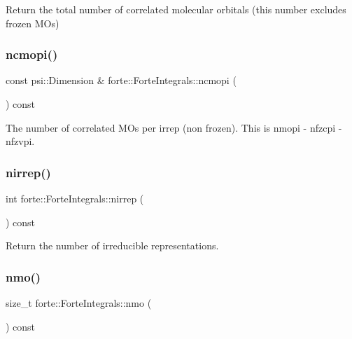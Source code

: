 Return the total number of correlated molecular orbitals (this number excludes frozen M\+Os) 

\mbox{\label{classforte_1_1_forte_integrals_a95947448d8e40f2be497e613512e64eb}} 
\subsubsection{\texorpdfstring{ncmopi()}{ncmopi()}}
{\footnotesize\ttfamily const psi\+::\+Dimension \& forte\+::\+Forte\+Integrals\+::ncmopi (\begin{DoxyParamCaption}{ }\end{DoxyParamCaption}) const}



The number of correlated M\+Os per irrep (non frozen). This is nmopi -\/ nfzcpi -\/ nfzvpi. 

\mbox{\label{classforte_1_1_forte_integrals_a85f2644fb48f17cfd172682b10a0d252}} 
\subsubsection{\texorpdfstring{nirrep()}{nirrep()}}
{\footnotesize\ttfamily int forte\+::\+Forte\+Integrals\+::nirrep (\begin{DoxyParamCaption}{ }\end{DoxyParamCaption}) const}



Return the number of irreducible representations. 

\mbox{\label{classforte_1_1_forte_integrals_ae1ba804bac41846e3fe915dbab9d57a7}} 
\subsubsection{\texorpdfstring{nmo()}{nmo()}}
{\footnotesize\ttfamily size\+\_\+t forte\+::\+Forte\+Integrals\+::nmo (\begin{DoxyParamCaption}{ }\end{DoxyParamCaption}) const}



